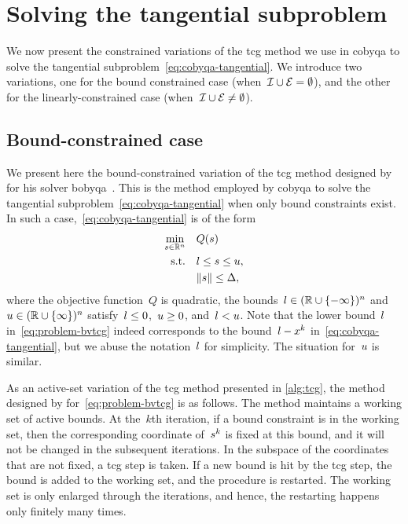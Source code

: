 \section{Solving the tangential subproblem}
\label{sec:cobyqa-tangential}

We now present the constrained variations of the \gls{tcg} method we use in \gls{cobyqa} to solve the tangential subproblem~\cref{eq:cobyqa-tangential}.
We introduce two variations, one for the bound constrained case (when~$\mathcal{I} \cup \mathcal{E} = \emptyset$), and the other for the linearly-constrained case (when~$\mathcal{I} \cup \mathcal{E} \neq \emptyset$).

\subsection{Bound-constrained case}

We present here the bound-constrained variation of the \gls{tcg} method designed by \citeauthor{Powell_2009} for his solver \gls{bobyqa}~\cite{Powell_2009}.
This is the method employed by \gls{cobyqa} to solve the tangential subproblem~\cref{eq:cobyqa-tangential} when only bound constraints exist.
In such a case,~\cref{eq:cobyqa-tangential} is of the form
\begin{subequations}
    \label{eq:problem-bvtcg}
    \begin{align}
        \min_{\sstep \in \R^n}  & \quad Q(\sstep) \label{eq:problem-bvtcg-obj}\\
        \text{s.t.}             & \quad \xl \le \sstep \le \xu,\\
                                & \quad \norm{\sstep} \le \rad,
    \end{align}
\end{subequations}
where the objective function~$Q$ is quadratic, the bounds~$l \in (\mathbb{R} \cup \{-\infty\})^n$ and~$u \in (\mathbb{R} \cup \{\infty\})^n$ satisfy~$l \le 0$,~$u \ge 0$, and~$l < u$.
Note that the lower bound~$l$ in~\cref{eq:problem-bvtcg} indeed corresponds to the bound~$\xl - \iter[k]$ in~\cref{eq:cobyqa-tangential}, but we abuse the notation~$l$ for simplicity.
The situation for~$u$ is similar.

As an active-set variation of the \gls{tcg} method presented in \cref{alg:tcg}, the method designed by \citeauthor{Powell_2009} for~\cref{eq:problem-bvtcg} is as follows.
The method maintains a working set of active bounds.
At the~$k$th iteration, if a bound constraint is in the working set, then the corresponding coordinate of~$\sstep[k]$ is fixed at this bound, and it will not be changed in the subsequent iterations.
In the subspace of the coordinates that are not fixed, a \gls{tcg} step is taken.
If a new bound is hit by the \gls{tcg} step, the bound is added to the working set, and the procedure is restarted.
The working set is only enlarged through the iterations, and hence, the restarting happens only finitely many times.

